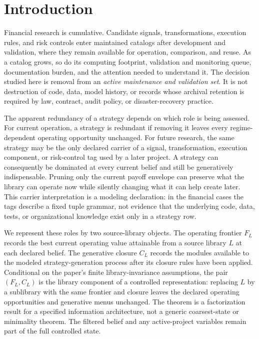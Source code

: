 \section{Introduction}
\label{sec:introduction}

Financial research is cumulative. Candidate signals, transformations,
execution rules, and risk controls enter maintained catalogs after development
and validation, where they remain available for operation, comparison, and
reuse. As a catalog grows, so do its computing footprint, validation and
monitoring queue, documentation burden, and the attention needed to understand
it. The decision studied here is removal from an \emph{active maintenance and
validation set}. It is not destruction of code, data, model history, or records
whose archival retention is required by law, contract, audit policy, or
disaster-recovery practice.

The apparent redundancy of a strategy depends on which role is being assessed.
For current operation, a strategy is redundant if removing it leaves every
regime-dependent operating opportunity unchanged. For future research, the
same strategy may be the only declared carrier of a signal, transformation,
execution component, or risk-control tag used by a later project. A
strategy can consequently be dominated at every current belief and still be
generatively indispensable. Pruning only the current payoff envelope can
preserve what the library can operate now while silently changing what it can
help create later. This carrier interpretation is a modeling declaration: in
the financial cases the tags describe a fixed tuple grammar, not evidence that
the underlying code, data, tests, or organizational knowledge exist only in a
strategy row.

We represent these roles by two source-library objects. The operating frontier
\(F_L\) records the best current operating value attainable from a source
library \(L\) at each declared belief. The generative closure \(C_L\) records
the modules available to the modeled strategy-generation process after its
closure rules have been applied. Conditional on the paper's finite
library-invariance assumptions, the pair \((F_L,C_L)\) is the library component
of a controlled representation: replacing \(L\) by a sublibrary with the same
frontier and closure leaves the declared operating opportunities and
generative menus unchanged. The theorem is a factorization result for a
specified information architecture, not a generic coarsest-state or minimality
theorem. The filtered belief and any active-project variables remain part of
the full controlled state.


